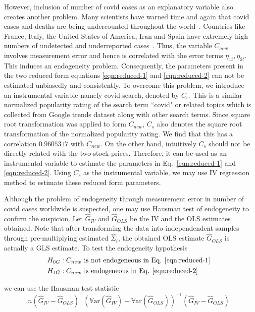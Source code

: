 \documentclass[11pt, a4paper]{article}
\begin{document}
However, inclusion of number of covid cases as an explanatory variable also creates another problem. Many scientists have warned time and again that covid cases and deaths are being undercounted throughout the world~\cite{covid-underreporting}. Countries like France, Italy, the United States of America, Iran and Spain have extremely high numbers of undetected and underreported cases~\cite{Lau-2020}. Thus, the variable $C_{new}$ involves measurement error and hence is correlated with the error terms $\eta_{1t}, \eta_{2t}$. This induces an endogeneity problem. Consequently, the parameters present in the two reduced form equations \eqref{eqn:reduced-1} and \eqref{eqn:reduced-2} can not be estimated unbiasedly and consistently. To overcome this problem, we introduce an instrumental variable namely covid search, denoted by $C_{s}$. This is a similar normalized popularity rating of the search term ``covid" or related topics which is collected from Google trends dataset along with other search terms. Since square root transformation was applied to form $C_{new}$, $C_s$ also denotes the square root transformation of the normalized popularity rating. We find that this has a correlation $0.9605317$ with $C_{new}$. On the other hand, intuitively $C_{s}$ should not be directly related with the two stock prices. Therefore, it can be used as an instrumental variable to estimate the parameters in Eq.~\eqref{eqn:reduced-1} and \eqref{eqn:reduced-2}. Using $C_s$ as the instrumental variable, we may use IV regression method to estimate these reduced form parameters.

Although the problem of endogeneity through measurement error in number of covid cases worldwide is suspected, one may use Hausman test of endogeneity to confirm the suspicion. Let $\widehat{G}_{IV}$ and $\widehat{G}_{OLS}$ be the IV and the OLS estimates obtained. Note that after transforming the data into independendent samples through pre-multiplying estimated $\widehat{\Sigma}_i$, the obtained OLS estimate $\widehat{G}_{OLS}$ is actually a GLS estimate. To test the endogeneity hypothesis 
\begin{align*}
    & H_{0G}: C_{new} \text{ is not endogeneous in Eq. } \eqref{eqn:reduced-1}\\
    & H_{1G}: C_{new} \text{ is endogeneous in Eq. }\eqref{eqn:reduced-2}
\end{align*}

\noindent we can use the Hausman test statistic 
%
$$n \left(\widehat{G}_{IV}-\widehat{G}_{OLS}\right)^{\intercal}\left(\mathbb{V}\text{ar}(\widehat{G}_{IV})-\mathbb{V}\text{ar}(\widehat{G}_{OLS})\right)^{-1}\left(\widehat{G}_{IV}-\widehat{G}_{OLS}\right)$$
\end{document}
